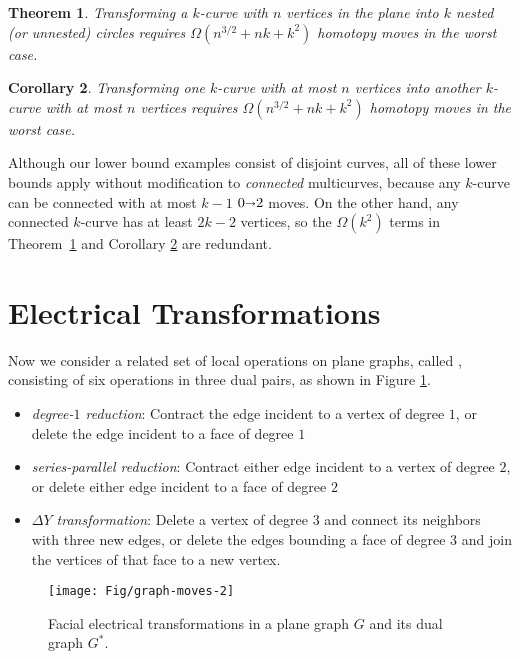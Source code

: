 \documentclass[11pt,twoside]{article}
\def\arcto{\mathord\shortrightarrow}
\def\arc#1#2{#1\arcto#2}
\let\EDIT\relax
\newtheorem{theorem}{Theorem}[section]
\newtheorem{corollary}[theorem]{Corollary}
\numberwithin{figure}{section}
\begin{document}
\begin{theorem}
\label{Th:multi-lower2}
Transforming a $k$-curve with $n$ vertices in the plane into $k$ nested (or unnested) circles requires $\Omega(n^{3/2} + nk + k^2)$ homotopy moves in the worst case.
\end{theorem}

\begin{corollary}
\label{C:multi-lower3}
Transforming one $k$-curve with at most $n$ vertices into another $k$-curve with at most $n$ vertices requires  $\Omega(n^{3/2} + nk + k^2)$ homotopy moves in the worst case.
\end{corollary}

Although our lower bound examples consist of disjoint curves, all of these lower bounds apply without modification to \emph{connected} multicurves, because any $k$-curve can be connected with at most $k-1$ $\arc{0}{2}$ moves.  On the other hand, any connected $k$-curve has at least $2k-2$ vertices, so the $\Omega(k^2)$ terms in Theorem~\ref{Th:multi-lower2} and Corollary \ref{C:multi-lower3} are redundant.

\section{Electrical Transformations}
\label{S:electric}

Now we consider a related set of local operations on plane graphs, called \EMPH{\EDIT{facial} electrical transformations}, consisting of six operations in three dual pairs, as shown in Figure \ref{F:elec-dual}.
\begin{itemize}\itemsep0pt
\item
\emph{degree-$1$ reduction}: Contract the edge incident to a vertex of degree $1$, or delete the edge incident to a face of degree $1$
\item
\emph{series-parallel reduction}: Contract either edge incident to a vertex of degree $2$, or delete either edge incident to a face of degree $2$
\item
\emph{$\Delta Y$ transformation}: Delete a vertex of degree 3 and connect its neighbors with three new edges, or delete the edges bounding a face of degree 3 and join the vertices of that face to a new vertex.
\end{itemize}

\begin{figure}[ht]
\centering
\texttt{[image: Fig/graph-moves-2]}
\caption{Facial electrical transformations in a plane graph $G$ and its dual graph $G^*$.}
\label{F:elec-dual}
\end{figure}
\end{document}
